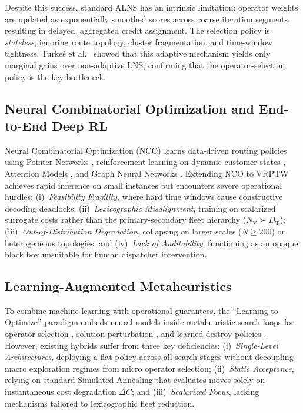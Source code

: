 \documentclass{ieeeaccess}
\newcommand{\NV}{{N_\mathrm{V}}}
\newcommand{\TD}{{D_\mathrm{T}}}
\begin{document}
Despite this success, standard ALNS has an intrinsic limitation: operator weights are updated as exponentially smoothed scores across coarse iteration segments, resulting in delayed, aggregated credit assignment. The selection policy is \emph{stateless}, ignoring route topology, cluster fragmentation, and time-window tightness. Turke\v{s} et al.\ \cite{turkes2021meta} showed that this adaptive mechanism yields only marginal gains over non-adaptive LNS, confirming that the operator-selection policy is the key bottleneck.

\subsection{Neural Combinatorial Optimization and End-to-End Deep RL}
\label{sec:rw_nco}

Neural Combinatorial Optimization (NCO) learns data-driven routing policies using Pointer Networks \cite{vinyals2015pointer, bello2016neural}, reinforcement learning on dynamic customer states \cite{nazari2018reinforcement}, Attention Models \cite{kool2019attention}, and Graph Neural Networks \cite{khalil2017learning, joshi2019efficient}. Extending NCO to VRPTW \cite{falkner2020learning, lin2021deep} achieves rapid inference on small instances but encounters severe operational hurdles: (i)~\emph{Feasibility Fragility}, where hard time windows cause constructive decoding deadlocks; (ii)~\emph{Lexicographic Misalignment}, training on scalarized surrogate costs rather than the primary-secondary fleet hierarchy ($\NV \succ \TD$); (iii)~\emph{Out-of-Distribution Degradation}, collapsing on larger scales ($N \ge 200$) or heterogeneous topologies; and (iv)~\emph{Lack of Auditability}, functioning as an opaque black box unsuitable for human dispatcher intervention.

\subsection{Learning-Augmented Metaheuristics}
\label{sec:rw_hybrid}

To combine machine learning with operational guarantees, the ``Learning to Optimize'' paradigm \cite{bengio2021machine} embeds neural models inside metaheuristic search loops for operator selection \cite{syberfeldt2009reinforcement, lu2020learning}, solution perturbation \cite{chen2019learning}, and learned destroy policies \cite{hottung2020neural, son2023learning}. However, existing hybrids suffer from three key deficiencies: (i)~\emph{Single-Level Architectures}, deploying a flat policy across all search stages without decoupling macro exploration regimes from micro operator selection; (ii)~\emph{Static Acceptance}, relying on standard Simulated Annealing that evaluates moves solely on instantaneous cost degradation $\Delta C$; and (iii)~\emph{Scalarized Focus}, lacking mechanisms tailored to lexicographic fleet reduction.
\end{document}
